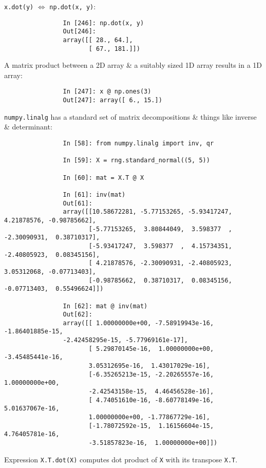 \documentclass{article}
\begin{document}
\begin{enumerate}
\begin{itemize}
\begin{itemize}
			{\tt x.dot(y)} $\Leftrightarrow$ {\tt np.dot(x, y)}:
			\begin{verbatim}
				In [246]: np.dot(x, y)
				Out[246]:
				array([[ 28., 64.],
				       [ 67., 181.]])
			\end{verbatim}
			A matrix product between a 2D array \& a suitably sized 1D array results in a 1D array:
			\begin{verbatim}
				In [247]: x @ np.ones(3)
				Out[247]: array([ 6., 15.])
			\end{verbatim}
			{\tt numpy.linalg} has a standard set of matrix decompositions \& things like inverse \& determinant:
			\begin{verbatim}
				In [58]: from numpy.linalg import inv, qr
				
				In [59]: X = rng.standard_normal((5, 5))
				
				In [60]: mat = X.T @ X
				
				In [61]: inv(mat)
				Out[61]: 
				array([[10.58672281, -5.77153265, -5.93417247,  4.21878576, -0.98785662],
				       [-5.77153265,  3.80844049,  3.598377  , -2.30090931,  0.38710317],
				       [-5.93417247,  3.598377  ,  4.15734351, -2.40805923,  0.08345156],
				       [ 4.21878576, -2.30090931, -2.40805923,  3.05312068, -0.07713403],
				       [-0.98785662,  0.38710317,  0.08345156, -0.07713403,  0.55496624]])
				
				In [62]: mat @ inv(mat)
				Out[62]: 
				array([[ 1.00000000e+00, -7.58919943e-16, -1.86401885e-15,
				-2.42458295e-15, -5.77969161e-17],
				       [ 5.29870145e-16,  1.00000000e+00, -3.45485441e-16,
				       3.05312695e-16,  1.43017029e-16],
				       [-6.35265213e-15, -2.20265557e-16,  1.00000000e+00,
				       -2.42543158e-15,  4.46456528e-16],
				       [ 4.74051610e-16, -8.60778149e-16,  5.01637067e-16,
				       1.00000000e+00, -1.77867729e-16],
				       [-1.78072592e-15,  1.16156604e-15,  4.76405781e-16,
				       -3.51857823e-16,  1.00000000e+00]])
			\end{verbatim}
			Expression {\tt X.T.dot(X)} computes dot product of {\tt X} with its transpose {\tt X.T}.
			

\end{itemize}
\end{itemize}
\end{enumerate}
\end{document}
